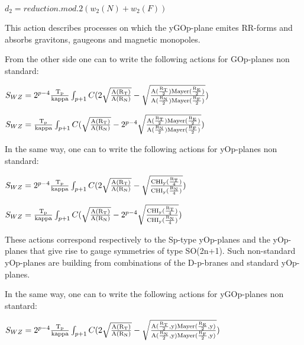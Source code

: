 \documentclass[a4paper,a4paper]{article}
\begin{document}
\begin{center}
{  $ d_2 = reduction.mod.2(w_2(N)+w_2(F))$ }
\end{center}

This action describes processes on which the yGOp-plane emites RR-forms and absorbs gravitons, gaugeons and magnetic monopoles.

From the other side one can to write the following actions for GOp-planes non 
standard:

\begin{center}
{  $ S_{WZ} = 2^{p-4}\frac{\rm T_p}{\rm kappa}\int_{p+1} C(2\sqrt{\frac{\rm A(R_T)}{\rm A(R_N)}}-\sqrt{\frac{\rm A(\frac{\rm R_T}{\rm 2})Mayer(\frac{\rm R_E}{\rm 2})}{\rm A(\frac{\rm R_N}{\rm 2})Mayer(\frac{\rm R_F}{\rm 2})}})$ }
\end{center}

\begin{center}
{  $ S_{WZ} = \frac{\rm T_p}{\rm kappa}\int_{p+1} C(\sqrt{\frac{\rm A(R_T)}{\rm A(R_N)}}-2^{p-4}\sqrt{\frac{\rm A(\frac{\rm R_T}{\rm 2})Mayer(\frac{\rm R_E}{\rm 2})}{\rm A(\frac{\rm R_N}{\rm 2})Mayer(\frac{\rm R_F}{\rm 2})}})$ }
\end{center}
In the same way, one can to write the following actions for yOp-planes non standard:
\begin{center}
{  $ S_{WZ} = 2^{p-4}\frac{\rm T_p}{\rm kappa}\int_{p+1} C(2\sqrt{\frac{\rm A(R_T)}{\rm A(R_N)}}-\sqrt{\frac{\rm CHI_y(\frac{\rm R_T}{\rm 4}) }{\rm CHI_y(\frac{\rm R_N}{\rm 4})}})$ }
\end{center}
\begin{center}
{  $ S_{WZ} = \frac{\rm T_p}{\rm kappa}\int_{p+1} C(\sqrt{\frac{\rm A(R_T)}{\rm A(R_N)}}-2^{p-4}\sqrt{\frac{\rm CHI_y(\frac{\rm R_T}{\rm 4} )}{\rm CHI_y(\frac{\rm R_N}{\rm 4})}})$ }
\end{center}
These actions correspond respectively to the Sp-type yOp-planes and the yOp-planes that give rise to gauge symmetries of type SO(2n+1).  Such non-standard yOp-planes are building from combinations of the D-p-branes and standard yOp-planes.

In the same way, one can to write the following actions for yGOp-planes non stantard:
\begin{center}
{  $ S_{WZ} = 2^{p-4}\frac{\rm T_p}{\rm kappa}\int_{p+1} C(2\sqrt{\frac{\rm A(R_T)}{\rm A(R_N)}}-\sqrt{\frac{\rm A(\frac{\rm R_T}{\rm 2},y)Mayer(\frac{\rm R_E}{\rm 2},y)}{\rm A(\frac{\rm R_N}{\rm 2},y)Mayer(\frac{\rm R_F}{\rm 2},y)}})$ }
\end{center}
\end{document}
